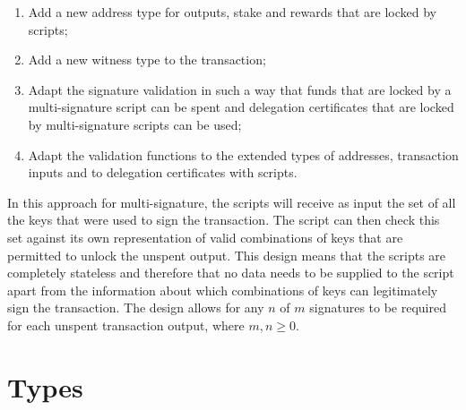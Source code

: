 \documentclass[11pt,a4paper,dvipsnames,twosided]{article}
\newcommand{\khcomment}[1]{\todo[color=blue!20]{KH: #1}}
\theoremstyle{definition}
\begin{document}
\begin{enumerate}
\item Add a new address type for outputs, stake and rewards that are locked by scripts;
\item Add a new witness type to the transaction;
\item Adapt the signature validation in such a way that funds that are locked\khcomment{reserved?} by a
  multi-signature script can be spent and delegation certificates that are locked by
  multi-signature scripts can be used;
\item Adapt the validation functions to the extended types of
  addresses, transaction inputs and to delegation certificates with scripts.
\end{enumerate}

In this approach for multi-signature, the scripts will receive as input the set of
all the keys that were used to sign the transaction. The script can then check this set
against its own representation of valid combinations of keys that are permitted to unlock the
unspent output.
%
This design means that the scripts are completely stateless and therefore that no data needs to be
supplied to the script apart from the information about which combinations of keys
can legitimately sign the transaction. The design allows for any $n$ of $m$
signatures to be required for each unspent transaction output, where $m, n \ge 0$.

\section{Types}
\label{sec:types}
\end{document}
